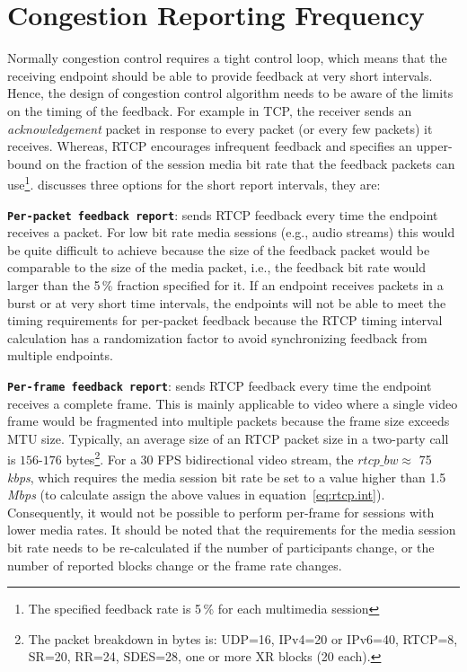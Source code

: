 \section{Congestion Reporting Frequency}
\label{fw.freq}

Normally congestion control requires a tight control loop, which means that
the receiving endpoint should be able to provide feedback at very short
intervals. Hence, the design of congestion control algorithm needs to be aware
of the limits on the timing of the feedback. For example in TCP, the receiver
sends an \emph{acknowledgement} packet in response to every packet (or every
few packets) it receives. Whereas, RTCP encourages infrequent feedback and
specifies an upper-bound on the fraction of the session media bit rate that
the feedback packets can use\footnote{The specified feedback rate is 5\,\% for
each multimedia session}. \cite{draft.rmcat.feedback} discusses three options
for the short report intervals, they are:

\textbf{\texttt{Per-packet feedback report}}: sends RTCP feedback every time
the endpoint receives a packet. For low bit rate media sessions (e.g., audio
streams) this would be quite difficult to achieve because the size of the
feedback packet would be comparable to the size of the media packet, i.e., the
feedback bit rate would larger than the 5\,\% fraction specified for it. If an
endpoint receives packets in a burst or at very short time intervals, the
endpoints will not be able to meet the timing requirements for per-packet
feedback because the RTCP timing interval calculation has a randomization
factor to avoid synchronizing feedback from multiple endpoints.

\textbf{\texttt{Per-frame feedback report}}: sends RTCP feedback every time
the endpoint receives a complete frame. This is mainly applicable to video
where a single video frame would be fragmented into multiple packets because
the frame size exceeds MTU size. Typically, an average size of an RTCP packet
size in a two-party call is $156$-$176$ bytes\footnote{The packet breakdown in
bytes is: UDP=16, IPv4=20 or IPv6=40, RTCP=8, SR=20, RR=24, SDES=28, one or
more XR blocks (20 each).}. For a 30 FPS bidirectional video stream, the
$rtcp\_bw \approx$ 75\,\emph{kbps}, which requires the media session bit rate
be set to a value higher than 1.5\,\emph{Mbps} (to calculate assign the above
values in equation~\ref{eq:rtcp.int}). Consequently, it would not be possible
to perform per-frame for sessions with lower media rates. It should be noted
that the requirements for the media session bit rate needs to be re-calculated
if the number of participants change, or the number of reported blocks change
or the frame rate changes.

